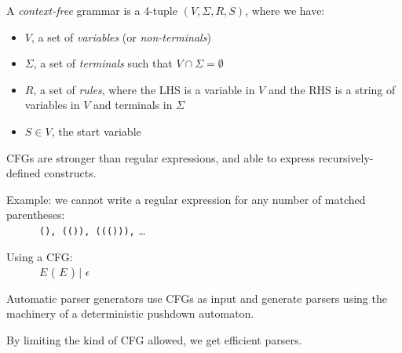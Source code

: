 \begin{slide*}
A {\em context-free} grammar is a 4-tuple $(V, \Sigma, R, S)$, where
we have:
\begin{itemize}
\item $V$, a set of {\em variables} (or {\em non-terminals}) 
\item $\Sigma$, a set of {\em terminals} such that $V \cap \Sigma = \emptyset$
\item $R$, a set of {\em rules}, where the LHS is a variable in $V$ and the RHS 
is a string of variables in $V$ and terminals in $\Sigma$
\item $S \in V$, the start variable
\end{itemize}
\vspace{.2in}

CFGs are stronger than regular expressions, and able to express
recursively-defined constructs.

\vspace{.2in}

Example: we cannot write a regular expression for any number of matched
parentheses:\\
~~~~~~{\tt (), (()), ((())),} \ldots

\vspace{.2in}

Using a CFG:\\
~~~~~~$E$ \RA{} ( $E$ ) $|$ $\epsilon$

\vfil
\end{slide*}

\begin{slide*}
Automatic parser generators use CFGs as input and generate parsers
using the machinery of a deterministic pushdown automaton.
\vspace{.2in}

\vspace{.2in}
By limiting the kind of CFG allowed, we get efficient parsers.
\vfil
\end{slide*}

